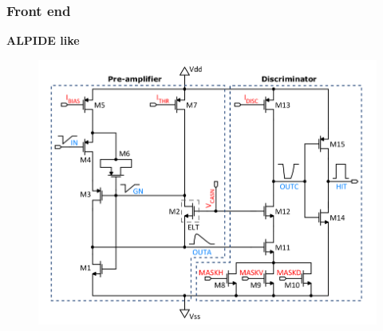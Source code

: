     \begin{frame}
        \frametitle{Front end}
            \textbf{ALPIDE like}
            \begin{figure}[h!]
                \centering
                \includegraphics[width=.8\linewidth]{figures/Monopix1/Monopix1_FE_circuit.png}        
            \end{figure}
    \end{frame}     



